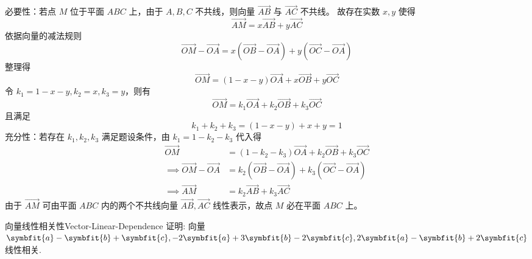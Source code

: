 \begin{myproof}
    必要性：若点 $M$ 位于平面 $ABC$ 上，由于 $A, B, C$ 不共线，则向量 $\overrightarrow{AB}$ 与 $\overrightarrow{AC}$ 不共线。
    故存在实数 $x, y$ 使得
    \begin{equation*}
        \overrightarrow{AM} = x\overrightarrow{AB} + y\overrightarrow{AC}
    \end{equation*}
    依据向量的减法规则
    \begin{equation*}
        \overrightarrow{OM} - \overrightarrow{OA} = x(\overrightarrow{OB} - \overrightarrow{OA}) + y(\overrightarrow{OC} - \overrightarrow{OA})
    \end{equation*}
    整理得
    \begin{equation*}
        \overrightarrow{OM} = (1 - x - y)\overrightarrow{OA} + x\overrightarrow{OB} + y\overrightarrow{OC}
    \end{equation*}
    令 $k_1 = 1 - x - y, k_2 = x, k_3 = y$，则有
    \begin{equation*}
        \overrightarrow{OM} = k_1\overrightarrow{OA} + k_2\overrightarrow{OB} + k_3\overrightarrow{OC}
    \end{equation*}
    且满足
    \begin{equation*}
        k_1 + k_2 + k_3 = (1 - x - y) + x + y = 1
    \end{equation*}
    充分性：若存在 $k_1, k_2, k_3$ 满足题设条件，由 $k_1 = 1 - k_2 - k_3$ 代入得
    \begin{equation*}
        \begin{aligned}
            \overrightarrow{OM}                                & = (1 - k_2 - k_3)\overrightarrow{OA} + k_2\overrightarrow{OB} + k_3\overrightarrow{OC}            \\
            \implies \overrightarrow{OM} - \overrightarrow{OA} & = k_2(\overrightarrow{OB} - \overrightarrow{OA}) + k_3(\overrightarrow{OC} - \overrightarrow{OA}) \\
            \implies \overrightarrow{AM}                       & = k_2\overrightarrow{AB} + k_3\overrightarrow{AC}
        \end{aligned}
    \end{equation*}
    由于 $\overrightarrow{AM}$ 可由平面 $ABC$ 内的两个不共线向量 $\overrightarrow{AB}, \overrightarrow{AC}$ 线性表示，故点 $M$ 必在平面 $ABC$ 上。
\end{myproof}


\begin{problem}{向量线性相关性}{Vector-Linear-Dependence}
    证明: 向量 $\symbfit{a} - \symbfit{b} + \symbfit{c}, -2\symbfit{a} + 3\symbfit{b} - 2\symbfit{c}, 2\symbfit{a} - \symbfit{b} + 2\symbfit{c}$ 线性相关.
\end{problem}

